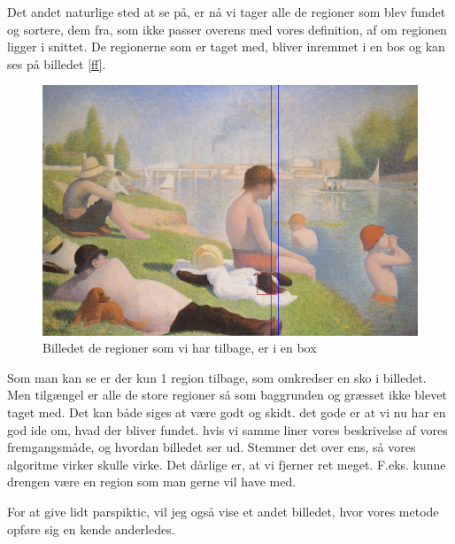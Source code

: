 Det andet naturlige sted at se på, er nå vi tager alle de regioner som
blev fundet og sortere, dem fra, som ikke passer overens med vores
definition, af om regionen ligger i snittet. De regionerne som er taget
med, bliver inremmet i en bos og kan ses på billedet \ref{ff}. 

\begin{figure}[h!!]
	\begin{center}
		\includegraphics[scale=0.42,angle=0]{afsnit/afprovning/billeder/boindingboxbilledet.png}
	\end{center}
	\caption[]{Billedet de regioner som vi har tilbage, er i en box}
	\label{blob}
\end{figure}

Som man kan se er der kun 1 region tilbage, som omkredser en sko i
billedet. Men tilgængel er alle de store regioner så som baggrunden og
græsset ikke blevet taget med. Det kan både siges at være godt og skidt.
det gode er at vi nu har en god ide om, hvad der bliver fundet. hvis vi
samme liner vores beskrivelse af vores fremgangsmåde, og hvordan
billedet ser ud. Stemmer det over ens, så vores algoritme virker skulle virke. Det
dårlige er, at vi fjerner ret meget. F.eks. kunne drengen være en
region som man gerne vil have med.

For at give lidt parspiktic, vil jeg også vise et andet billedet, hvor
vores metode opføre sig en kende anderledes.
	
